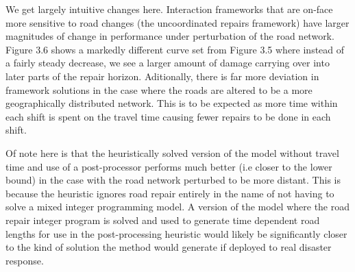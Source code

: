 We get largely intuitive changes here. Interaction frameworks that are on-face more sensitive to road changes (the uncoordinated repairs framework) have larger magnitudes of change in performance under perturbation of the road network. Figure 3.6 shows a markedly different curve set from Figure 3.5 where instead of a fairly steady decrease, we see a larger amount of damage carrying over into later parts of the repair horizon. Aditionally, there is far more deviation in framework solutions in the case where the roads are altered to be a more geographically distributed network. This is to be expected as more time within each shift is spent on the travel time causing fewer repairs to be done in each shift.

Of note here is that the heuristically solved version of the model without travel time and use of a post-processor performs much better (i.e closer to the lower bound) in the case with the road network perturbed to be more distant. This is  because the heuristic ignores road repair entirely in the name of not having to solve a mixed integer programming model. A version of the model where the road repair integer program is solved and used to generate time dependent road lengths for use in the post-processing heuristic would likely be significantly closer to the kind of solution the method would generate if deployed to real disaster response.

